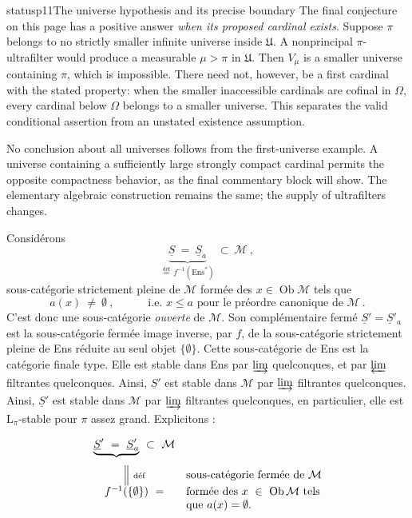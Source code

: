 \begin{dcomment}{status}{p11}{The universe hypothesis and its precise boundary}
The final conjecture on this page has a positive answer \emph{when its proposed cardinal exists}. Suppose $\pi$ belongs to no strictly smaller infinite universe inside $\mathfrak U$. A nonprincipal $\pi$-ultrafilter would produce a measurable $\mu>\pi$ in $\mathfrak U$. Then $V_\mu$ is a smaller universe containing $\pi$, which is impossible. There need not, however, be a first cardinal with the stated property: when the smaller inaccessible cardinals are cofinal in $\Omega$, every cardinal below $\Omega$ belongs to a smaller universe. This separates the valid conditional assertion from an unstated existence assumption.

No conclusion about all universes follows from the first-universe example. A universe containing a sufficiently large strongly compact cardinal permits the opposite compactness behavior, as the final commentary block will show. The elementary algebraic construction remains the same; the supply of ultrafilters changes.
\end{dcomment}


Considérons
\[
\underbrace{\underline{S}\ =\ \underline{S}_a}_{\overset{\text{déf}}{=}\,f^{-1}(\mathrm{Ens}^*)}\ \subset\ \mathcal{M}\ ,
\]
sous-catégorie strictement pleine de $\mathcal{M}$ formée des $x\in\operatorname{Ob}\mathcal{M}$ tels que
\[
a(x)\ \neq\ \emptyset\ ,\qquad\quad \text{i.e. } x\leqslant a \text{ pour le préordre canonique de } \mathcal{M}\ .
\]
C'est donc une sous-catégorie \textit{ouverte} de $\mathcal{M}$. Son complémentaire fermé $\underline{S}'=\underline{S}'_a$ est la sous-catégorie fermée image inverse, par $f$, de la sous-catégorie strictement pleine de Ens réduite au seul objet $\{\emptyset\}$. Cette sous-catégorie de Ens est la catégorie finale type. Elle est stable dans Ens par $\mathop{\underrightarrow{\mathrm{lim}}}$ quelconques, et par $\mathop{\underleftarrow{\mathrm{lim}}}$ filtrantes quelconques. Ainsi, $\underline{S}'$ est stable dans $\mathcal{M}$ par $\mathop{\underrightarrow{\mathrm{lim}}}$ filtrantes quelconques. Ainsi, $\underline{S}'$ est stable dans $\mathcal{M}$ par $\mathop{\underrightarrow{\mathrm{lim}}}$ filtrantes quelconques, en particulier, elle est $\mathrm{L}_\pi$-stable pour $\pi$ assez grand. Explicitons :

\[
\begin{array}{cl}
\underbrace{\underline{S}'\ =\ \underline{S}'_a}_{}\ \subset\ \mathcal{M} & \\
\Big\|\ \text{\scriptsize déf} & \text{sous-catégorie fermée de } \mathcal{M}\\
f^{-1}(\{\emptyset\})\ = & \text{formée des } x\ \in\ \operatorname{Ob}\mathcal{M} \text{ tels}\\
 & \text{que } a(x)=\emptyset.
\end{array}
\]

